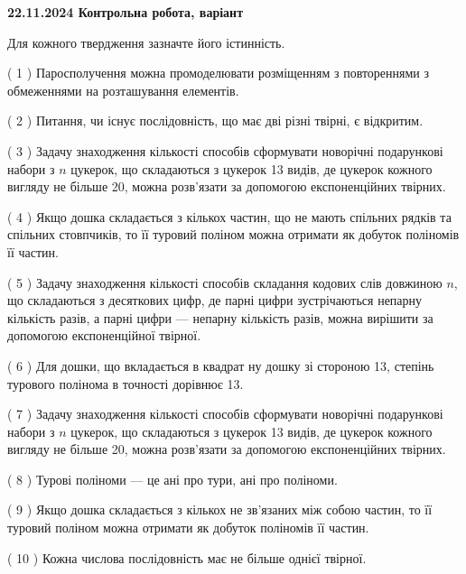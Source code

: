 \documentclass[12pt, ukrainian]{article}
\begin{document}
\vspace{4mm}
\newpage
\begin {large}

\textbf{22.11.2024 Контрольна робота, варіант  }\par


{
Для кожного твердження зазначте його істинність.\par
\vspace{2mm}
( 1 ) Паросполучення можна промоделювати розміщенням з повтореннями з обмеженнями на розташування елементів.%

( 2 ) Питання, чи існує послідовність, що має дві різні твірні, є відкритим.%

( 3 ) Задачу знаходження кількості способів сформувати новорічні подарункові набори з $n$ цукерок, що складаються з цукерок 13 видів, де цукерок кожного вигляду не більше 20, можна розв’язати за допомогою експоненційних твірних.%

( 4 ) Якщо дошка складається з кількох частин, що не мають спільних рядків та спільних стовпчиків, то її туровий поліном можна отримати як добуток поліномів її частин.%

( 5 ) Задачу знаходження кількості способів складання кодових слів довжиною $n$, що складаються з десяткових цифр, де парні цифри зустрічаються непарну кількість разів, а парні цифри — непарну кількість разів, можна вирішити за допомогою експоненційної твірної.%

( 6 ) Для дошки, що вкладається в квадрат ну дошку зі стороною 13, степінь турового полінома в точності дорівнює 13.%

( 7 ) Задачу знаходження кількості способів сформувати новорічні подарункові набори з $n$ цукерок, що складаються з цукерок 13 видів, де цукерок кожного вигляду не більше 20, можна розв’язати за допомогою експоненційних твірних.%

( 8 ) Турові поліноми --- це ані про тури, ані про поліноми.%

( 9 ) Якщо дошка складається з кількох не зв’язаних між собою частин, то її туровий поліном можна отримати як добуток поліномів її частин.%

( 10 ) Кожна числова послідовність має не більше однієї твірної.%


\vspace{5mm}
}
\end {large}
\end{document}
